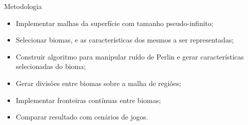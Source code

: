 \begin{frame}{Metodologia}
    \begin{itemize}
        \item Implementar malhas da superfície com tamanho pseudo-infinito;
        \item Selecionar biomas, e as características dos mesmos a ser representadas;
        \item Construir algoritmo para manipular ruído de Perlin e gerar características
            selecionadas do bioma;
        \item Gerar divisões entre biomas sobre a malha de regiões;
        \item Implementar fronteiras contínuas entre biomas;
        \item Comparar resultado com cenários de jogos.
    \end{itemize}
\end{frame}